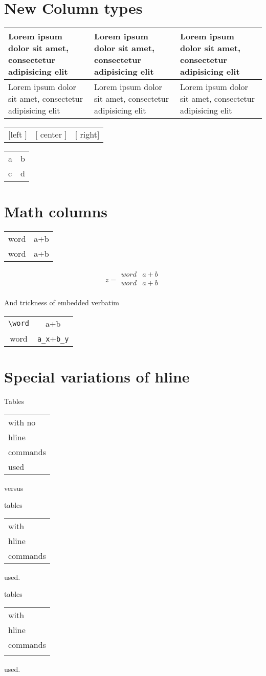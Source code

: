 \documentclass{article}
\begin{document}
\section{New Column types}
\begin{tabular}{|p{1in}|m{1in}|b{1in}|}\hline
Lorem ipsum dolor sit amet, consectetur adipisicing elit &
Lorem ipsum dolor sit amet, consectetur adipisicing elit &
Lorem ipsum dolor sit amet, consectetur adipisicing elit \\\hline
Lorem ipsum dolor sit amet, consectetur adipisicing elit &
Lorem ipsum dolor sit amet, consectetur adipisicing elit &
Lorem ipsum dolor sit amet, consectetur adipisicing elit \\
\hline
\end{tabular}

\begin{tabular}{|>{[}l<{]}|>{[}c<{]}|>{[}r<{]}|}
left & center & right\\
\end{tabular}

\begin{tabular}{l!{--}l}
  a & b \\
  c & d \\
\end{tabular}

\section{Math columns}
\begin{tabular}{cC}
word & a+b \\
word & a+b \\
\end{tabular}

\begin{equation}
z=
\begin{array}{Cc}
word & a+b \\
word & a+b \\
\end{array}
\end{equation}

And trickness of embedded verbatim
\begin{tabular}{cC}
\verb|\word| & a+b \\
word & \verb|a_x|+\verb|b_y| \\
\end{tabular}

\section{Special variations of hline}
Tables
\begin{tabular}[t]{l}
with no\\ hline \\ commands \\ used
\end{tabular} versus

tables
\begin{tabular}[t]{|l|}
\hline
with\\ hline \\ commands \\ 
\hline
\end{tabular} used.


tables
\begin{tabular}[t]{|l|}
\firsthline
with\\ hline \\ commands \\ 
\lasthline
\end{tabular} used.
\end{document}
